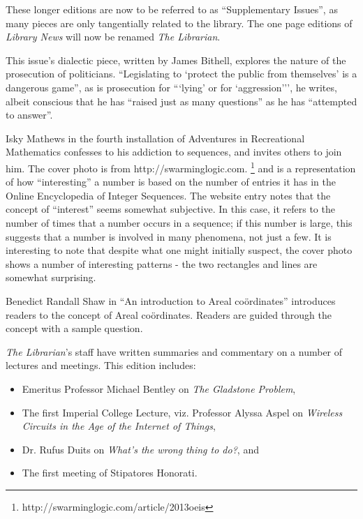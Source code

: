 \documentclass[11pt,a4paper]{report}
\begin{document}
	\begin{multicols}{2}

		\columnbreak
		These longer editions are now to be referred to as ``Supplementary Issues'', as many pieces are only tangentially related to the library. The one page editions of \textit{Library News} will now be renamed \textit{The Librarian}.
		
		This issue's dialectic piece, written by James Bithell, explores the nature of the prosecution of politicians. ``Legislating to `protect the public from themselves' is a dangerous game'', as is prosecution for ```lying' or for `aggression{'}'', he writes, albeit conscious that he has ``raised just as many questions'' as he has ``attempted to answer''.
		
		Isky Mathews in the fourth installation of Adventures in Recreational Mathematics confesses to his addiction to sequences, and invites others to join him. The cover photo is from http://swarminglogic.com. \footnote{http://swarminglogic.com/article/2013\textunderscore{}oeis} and is a representation of how ``interesting'' a number is based on the number of entries it has in the Online Encyclopedia of Integer Sequences. The website entry notes that the concept of ``interest'' seems somewhat subjective. In this case, it refers to the number of times that a number occurs in a sequence; if this number is large, this suggests that a number is involved in many phenomena, not just a few. It is interesting to note that despite what one might initially suspect, the cover photo shows a number of interesting patterns - the two rectangles and lines are somewhat surprising. 
		
		Benedict Randall Shaw in ``An introduction to Areal coördinates'' introduces readers to the concept of Areal coördinates. Readers are guided through the concept with a sample question.
		
		\textit{The Librarian}'s staff have written summaries and commentary on a number of lectures and meetings. This edition includes:
		\begin{itemize}
			\item Emeritus Professor Michael Bentley on \textit{The Gladstone Problem},
			\item The first Imperial College Lecture, viz. Professor Alyssa Aspel on \textit{Wireless Circuits in the Age of the Internet of Things},
			\item Dr. Rufus Duits on \textit{What's the wrong thing to do?}, and
			\item The first meeting of Stipatores Honorati.
		\end{itemize}
		

\end{multicols}
\end{document}
